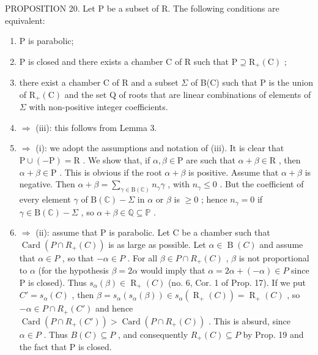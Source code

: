 PROPOSITION 20. Let P be a subset of R. The following conditions are equivalent:

\begin{enumerate}
\def\labelenumi{(\roman{enumi})}
\item
  P is parabolic;
\item
  P is closed and there exists a chamber C of R such that \(\mathrm{P} \supseteq \mathrm{R}_{+}(\mathrm{C})\) ;
\item
  there exist a chamber C of R and a subset \(\Sigma\) of B(C) such that P is the union of \(\mathrm{R}_{+}(\mathrm{C})\) and the set Q of roots that are linear combinations of elements of \(\Sigma\) with non-positive integer coefficients.
\item
  \(\Longrightarrow\) (iii): this follows from Lemma 3.
\item
  \(\Longrightarrow\) (i): we adopt the assumptions and notation of (iii). It is clear that \(\mathrm{P} \cup (-\mathrm{P}) = \mathrm{R}\) . We show that, if \(\alpha, \beta \in \mathrm{P}\) are such that \(\alpha + \beta \in \mathrm{R}\) , then \(\alpha + \beta \in \mathrm{P}\) . This is obvious if the root \(\alpha + \beta\) is positive. Assume that \(\alpha + \beta\) is negative. Then \(\alpha + \beta = \sum_{\gamma \in \mathrm{B}(\mathbb{C})} n_{\gamma} \gamma\) , with \(n_{\gamma} \leqslant 0\) . But the coefficient of every element \(\gamma\) of \(\mathrm{B}(\mathbb{C}) - \Sigma\) in \(\alpha\) or \(\beta\) is \(\geqslant 0\) ; hence \(n_{\gamma} = 0\) if \(\gamma \in \mathrm{B}(\mathbb{C}) - \Sigma\) , so \(\alpha + \beta \in \mathbb{Q} \subseteq \mathbb{P}\) .
\item
  \(\Longrightarrow\) (ii): assume that P is parabolic. Let C be a chamber such that \(\operatorname{Card}(P\cap R_{+}(C))\) is as large as possible. Let \(\alpha\in\operatorname{B}(C)\) and assume that \(\alpha\in P\) , so that \(-\alpha\in P\) . For all \(\beta\in P\cap R_{+}(C)\) , \(\beta\) is not proportional to \(\alpha\) (for the hypothesis \(\beta=2\alpha\) would imply that \(\alpha=2\alpha+(-\alpha)\in P\) since P is closed). Thus \(s_{\alpha}(\beta)\in\operatorname{R}_{+}(C)\) (no. 6, Cor. 1 of Prop. 17). If we put \(C'=s_{\alpha}(C)\) , then \(\beta=s_{\alpha}(s_{\alpha}(\beta))\in s_{\alpha}(\operatorname{R}_{+}(C))=\operatorname{R}_{+}(C)\) , so \(-\alpha\in P\cap R_{+}(C')\) and hence \(\operatorname{Card}(P\cap R_{+}(C'))>\operatorname{Card}(P\cap R_{+}(C))\) . This is absurd, since \(\alpha\in P\) . Thus \(B(C)\subseteq P\) , and consequently \(R_{+}(C)\subseteq P\) by Prop. 19 and the fact that P is closed.
\end{enumerate}

